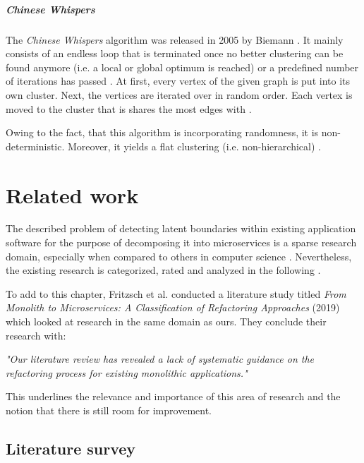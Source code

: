 \documentclass[12pt,a4paper]{report}
\begin{document}
\paragraph{Chinese Whispers \cite{biemann2006chinese}}
The \textit{Chinese Whispers} algorithm was released in 2005 by Biemann
\cite{biemann2006chinese}.
It mainly consists of an endless loop that is terminated once no better
clustering can be found anymore (i.e. a local or global optimum is reached)
or a predefined number of iterations has passed \cite{biemann2006chinese}.
At first, every vertex of the given graph is put into its own cluster.
Next, the vertices are iterated over in random order. Each vertex is moved
to the cluster that is shares the most edges with \cite{biemann2006chinese}.

Owing to the fact, that this algorithm is incorporating randomness,
it is non\hyp deterministic. Moreover, it yields a flat clustering
(i.e. non\hyp hierarchical) \cite{biemann2006chinese}.




\chapter{Related work} \label{chap:related}

The described problem of detecting latent boundaries within existing
application software for the purpose of decomposing it into microservices is
a sparse research domain, especially when compared to others
in computer science \cite{fritzsch2018monolith}.
Nevertheless, the existing research is categorized, rated and analyzed in the
following \textit{}.

To add to this chapter, Fritzsch et al. conducted a literature study titled
\textit{From Monolith to Microservices: A Classification of Refactoring Approaches} (2019)
\cite{fritzsch2018monolith} which looked at research in the same domain as ours.
They conclude their research with:
\begin{displayquote}
\emph{"Our literature review has revealed a lack of systematic guidance on the
refactoring process for existing monolithic applications."}~\cite{fritzsch2018monolith}
\end{displayquote}
This underlines the relevance and importance of this area of research and the
notion that there is still room for improvement.
\newpage



\section{Literature survey} \label{subsect:literature-survey}
\end{document}
